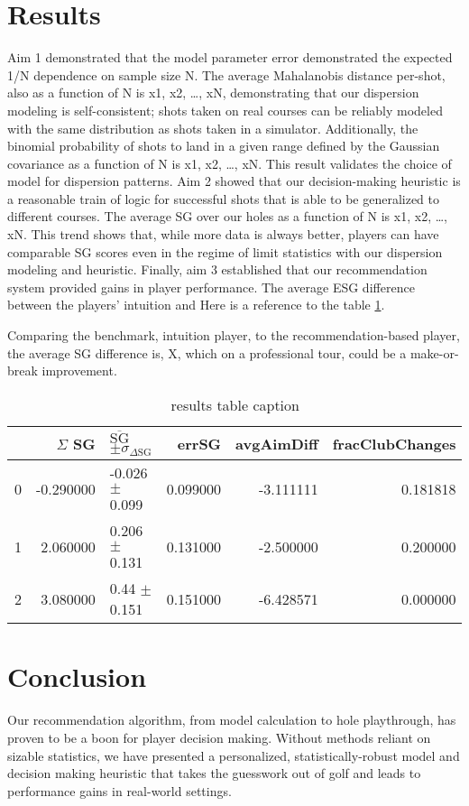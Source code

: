 \documentclass[11pt,a4paper]{article}
\begin{document}
\section{Results}
Aim 1 demonstrated that the model parameter error demonstrated the expected 1/N dependence on sample size N. The average Mahalanobis distance per-shot, also as a function of N is {x1, x2, …, xN}, demonstrating that our dispersion modeling is self-consistent; shots taken on real courses can be reliably modeled with the same distribution as shots taken in a simulator. Additionally, the binomial probability of shots to land in a given range defined by the Gaussian covariance as a function of N is {x1, x2, …, xN}. This result validates the choice of model for dispersion patterns.
Aim 2 showed that our decision-making heuristic is a reasonable train of logic for successful shots that is able to be generalized to different courses. The average SG over our holes as a function of N is {x1, x2, …, xN}. This trend shows that, while more data is always better, players can have comparable SG scores even in the regime of limit statistics with our dispersion modeling and heuristic.
Finally, aim 3 established that our recommendation system provided gains in player performance. The average ESG difference between the players’ intuition and 
Here is a reference to the table \ref{tab:results}.

Comparing the benchmark, intuition player, to the recommendation-based player, the average SG difference is, X, which on a professional tour, could be a make-or-break improvement.
\begin{table}
\caption{results table caption}
\label{tab:results}
\begin{tabular}{lrlrrr}
\toprule
 & $\Sigma$ SG & $\overline{\text{SG}}$ $\pm \sigma_{\Delta \text{SG}}$ & errSG & avgAimDiff & fracClubChanges \\
\midrule
0 & -0.290000 & -0.026 $\pm$ 0.099 & 0.099000 & -3.111111 & 0.181818 \\
1 & 2.060000 & 0.206 $\pm$ 0.131 & 0.131000 & -2.500000 & 0.200000 \\
2 & 3.080000 & 0.44 $\pm$ 0.151 & 0.151000 & -6.428571 & 0.000000 \\
\bottomrule
\end{tabular}
\end{table}

\section{Conclusion}
Our recommendation algorithm, from model calculation to hole playthrough, has proven to be a boon for player decision making. Without methods reliant on sizable statistics, we have presented a personalized, statistically-robust model and decision making heuristic that takes the guesswork out of golf and leads to performance gains in real-world settings.
\end{document}
